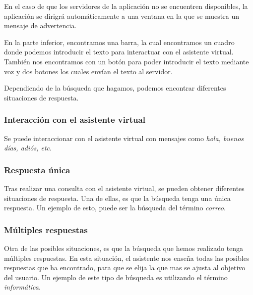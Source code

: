 
\newpage

En el caso de que los servidores de la aplicación no se encuentren disponibles, la aplicación se dirigrá automáticamente a una ventana en la que se muestra un mensaje de advertencia.


En la parte inferior, encontramos una barra, la cual encontramos un cuadro donde podemos introducir el texto para interactuar con el asistente virtual. También nos encontramos con un botón para poder introducir el texto mediante voz y dos botones los cuales envían el texto al servidor.


Dependiendo de la búsqueda que hagamos, podemos encontrar diferentes situaciones de respuesta.

\newpage

\subsubsection{Interacción con el asistente virtual}

Se puede interaccionar con el asistente virtual con mensajes como \textit{hola, buenos días, adiós, etc}.


\newpage

\subsubsection{Respuesta única}

Tras realizar una consulta con el asistente virtual, se pueden obtener diferentes situaciones de respuesta. Una de ellas, es que la búsqueda tenga una única respuesta. Un ejemplo de esto, puede ser la búsqueda del término \textit{correo}.


\newpage

\subsubsection{Múltiples respuestas}

Otra de las posibles situaciones, es que la búsqueda que hemos realizado tenga múltiples respuestas. En esta situación, el asistente nos enseña todas las posibles respuestas que ha encontrado, para que se elija la que mas se ajusta al objetivo del usuario. Un ejemplo de este tipo de búsqueda es utilizando el término \textit{informática}.

